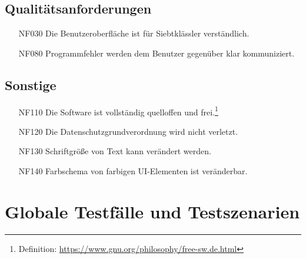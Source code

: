 \documentclass[parskip=full]{scrartcl}
\begin{document}
\subsection{Qualitätsanforderungen}

\begin{itemize}

\item[NF030] Die Benutzeroberfläche ist für Siebtklässler verständlich.
\item[NF080] Programmfehler werden dem Benutzer gegenüber klar kommuniziert.

\end{itemize}

\subsection{Sonstige}

\begin{itemize}

\item[NF110] Die Software ist vollständig quelloffen und frei.\footnote{Definition: \url{https://www.gnu.org/philosophy/free-sw.de.html}}
\item[NF120] Die Datenschutzgrundverordnung wird nicht verletzt.
\item[NF130] Schriftgröße von Text kann verändert werden.
\item[NF140] Farbschema von farbigen UI-Elementen ist veränderbar.

\end{itemize}

\section{Globale Testfälle und Testszenarien}
\end{document}
